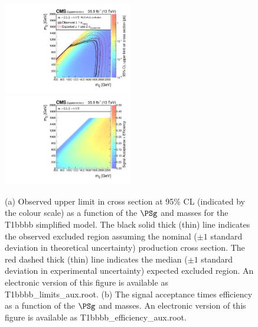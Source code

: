 \begin{figure}
    \begin{center}
            \includegraphics[width=0.50\textwidth]{Supplementary/T1bbbbXSEC}
            \includegraphics[width=0.50\textwidth]{Supplementary/T1bbbb_efficiency_aux}
        \caption{ (a) Observed upper limit in cross section at 95\% CL (indicated
        by the colour scale) as a function of 
        the $\PSg$ and \PSGczDo %
        masses for the 
        T1bbbb %
        simplified  model.  The  black  solid thick  (thin)  line indicates  the
        observed  excluded  region  assuming   the  nominal  (${\pm}1$  standard
        deviation in theoretical uncertainty)  production cross section. The red
        dashed  thick  (thin)  line  indicates  the  median  (${\pm}1$  standard
        deviation in experimental uncertainty) expected excluded region.
    An electronic version of this figure is available as T1bbbb\_limits\_aux.root.
        (b) The signal acceptance times efficiency as a function of 
        the $\PSg$ and \PSGczDo %
        masses.
    An electronic version of this figure is available as T1bbbb\_efficiency\_aux.root.
        }
        \label{fig:T1bbbb}
    \end{center}
\end{figure}

